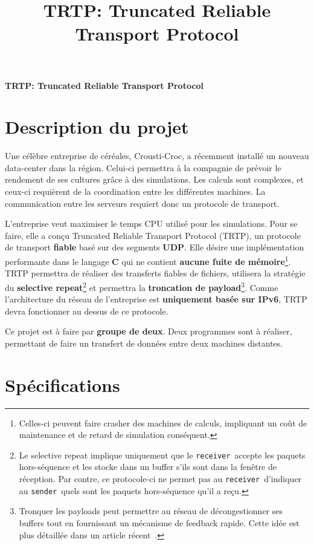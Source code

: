 \documentclass[a4paper,12pt]{article}
\def\mytitle{TRTP: Truncated Reliable Transport Protocol}\title{\mytitle}
\newcommand{\sender}{\texttt{sender}}
\newcommand{\receiver}{\texttt{receiver}}
\begin{document}
\rmfamily %
\pagestyle{fancy} %

\begin{center}
    \huge\bfseries\mytitle%
    \vspace{5ex}
\end{center} %

\section{Description du projet}
Une célèbre entreprise de céréales, Crousti-Croc, a récemment installé un nouveau data-center dans la région.
Celui-ci permettra à la compagnie de prévoir le rendement de ses cultures grâce à des simulations.
Les calculs sont complexes, et ceux-ci requièrent de la coordination entre les différentes machines.
La communication entre les serveurs requiert donc un protocole de transport.

L'entreprise veut maximiser le temps CPU utilisé pour les simulations.
Pour se faire, elle a conçu Truncated Reliable Transport Protocol (TRTP), un protocole de transport \textbf{fiable} basé sur des segments \textbf{UDP}.
Elle désire une implémentation performante dans le langage \textbf{C} qui ne contient \textbf{aucune fuite de mémoire}\footnote{Celles-ci peuvent faire crasher des machines de calculs, impliquant un coût de maintenance et de retard de simulation conséquent.}.
TRTP permettra de réaliser des transferts fiables de fichiers, utilisera la
stratégie du \textbf{selective repeat}\footnote{Le selective repeat implique
uniquement que le \receiver\ accepte les paquets hors-séquence et les stocke
dans un buffer s'ils sont dans la fenêtre de réception. Par contre, ce
protocole-ci ne permet pas au \receiver\ d'indiquer au \sender\ quels sont les
paquets hors-séquence qu'il a reçu.} et permettra la \textbf{troncation de payload}\footnote{Tronquer les payloads peut permettre au réseau de décongestionner ses buffers tout en fournissant un mécanisme de feedback rapide. Cette idée est plus détaillée dans un article récent~\cite{handley2017re}.}.
Comme l'architecture du réseau de l'entreprise est \textbf{uniquement basée sur IPv6}, TRTP devra fonctionner au dessus de ce protocole.

Ce projet est à faire par \textbf{groupe de deux}.
Deux programmes sont à réaliser, permettant de faire un transfert de données entre
deux machines distantes.

\section{Spécifications}
\end{document}
